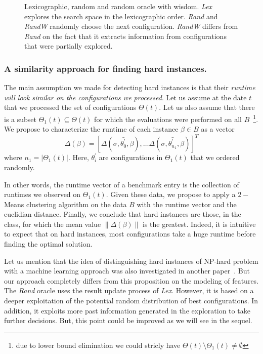 \documentclass[10pt, conference, compsocconf]{IEEEtran}
\newcommand{\norm}[1]{\left\lVert#1\right\rVert}
\begin{document}
	\begin{figure}[hbtp]
	\begin{center}
	
	\caption{Lexicographic, random and random oracle with wisdom.
        {\it Lex} explores the search space in the lexicographic order. {\it Rand}  and {\it RandW} 
        randomly choose the next configuration. {\it RandW} differs from {\it Rand} on the fact that 
        it extracts information from configurations that were partially explored.}
	\label{fig:Search}
	\end{center}
	\end{figure}


\subsubsection{A similarity approach for finding hard instances.}  

The main assumption we made for detecting hard instances is that their
{\it runtime will look similar on the configurations we processed}.
Let us assume at the date $t$ that we processed the set of
configurations $\Theta(t)$. Let us also assume that there is a subset
$\Theta_1(t) \subseteq \Theta(t)$ for which the evaluations were
performed on all $B$~\footnote{due to lower bound elimination we could
  stricly have $\Theta(t) \setminus \Theta_1(t) \neq \emptyset$}.  We
propose to characterize the runtime of each instance $\beta \in B$ as
a vector
\[ \Delta(\beta) = [\Delta(\sigma, \bar{\theta^{'}_0}, \beta), \dots
\Delta(\sigma, \bar{\theta^{'}_{n_1}}, \beta) ]^T \]
where $n_1 = |\Theta_1(t)|$. Here, $\theta^{'}_{i}$ are configurations
in $\Theta_1(t)$ that we ordered randomly.

In other words, the runtime vector of a benchmark entry is the
collection of runtimes we observed on $\Theta_1(t)$.  Given these
data, we propose to apply a $2-$Means clustering algorithm on the data
$B$ with the runtime vector and the euclidian distance. Finally, we
conclude that hard instances are those, in the class, for which the
mean value $\norm{\Delta(\beta)}$ is the greatest. Indeed, it is
intuitive to expect that on hard instances, most configurations take a
huge runtime before finding the optimal solution.

Let us mention that the idea of distinguishing hard instances of
NP-hard problem with a machine learning approach was also investigated
in another paper~\cite{WZZReport}. But our approach completely differs
from this proposition on the modeling of features.  The {\it Rand}
oracle uses the result update process of {\it Lex}. However, it is
based on a deeper exploitation of the potential random distribution of
best configurations. In addition, it exploits more past information
generated in the exploration to take further decisions. But, this
point could be improved as we will see in the sequel.
\end{document}
